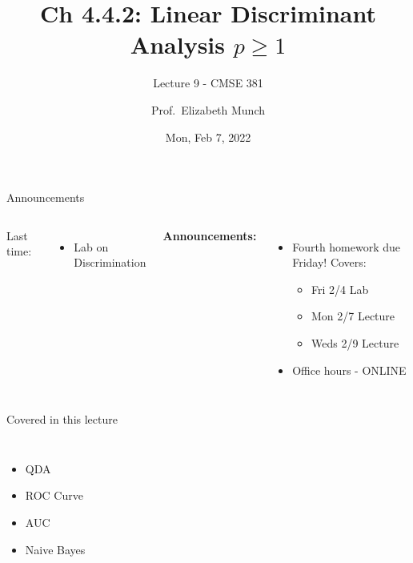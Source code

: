 \documentclass[aspectratio=169,usenames,dvipsnames]{beamer}
\begin{document}
\title[]{Ch 4.4.2: Linear Discriminant Analysis $p\geq1$}
\subtitle{Lecture 9 - CMSE 381}
\date{Mon, Feb 7, 2022}



\author[Dr.~Munch]{Prof.~Elizabeth Munch}

\begin{frame}
 \titlepage


\end{frame}
\begin{frame}[c]{Announcements}

\begin{columns}
\centering

	Last time:
	\begin{itemize}
		\item Lab on Discrimination
	\end{itemize}
\centering

\textbf{Announcements:}
	\begin{itemize}
		\item Fourth homework due Friday! Covers:
		\begin{itemize}
			\item Fri 2/4 Lab
			\item Mon 2/7 Lecture
			\item Weds 2/9 Lecture
		\end{itemize}
		\item Office hours - ONLINE
	\end{itemize}
\end{columns}

\end{frame}
\begin{frame}[c]{Covered in this lecture }

\begin{columns}
\centering
\begin{itemize}
	\item QDA
	\item ROC Curve
	\item AUC
	\item Naive Bayes
\end{itemize}
\centering

\end{columns}

\end{frame}
\end{document}
